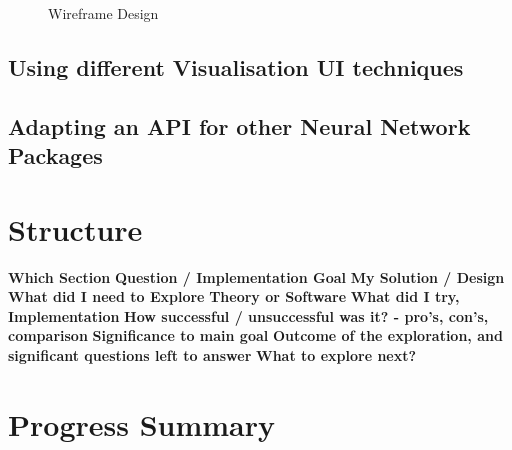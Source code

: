 \documentclass[a4paper,11pt,titlepage]{article}
\begin{document}
	\begin{figure}[H]
    			\caption{Wireframe Design}%
	\end{figure}	
	
	\subsection{Using different Visualisation UI techniques}	
	\subsection{Adapting an API for other Neural Network Packages}
	
\section{Structure}
	\textbf{Which Section}
	\textbf{Question / Implementation Goal}
	\textbf{My Solution / Design}
	\textbf{What did I need to Explore}
	\textbf{Theory or Software}
	\textbf{What did I try, Implementation}
	\textbf{How successful / unsuccessful was it? - pro's, con's, comparison}
	\textbf{Significance to main goal}
	\textbf{Outcome of the exploration, and significant questions left to answer}
	\textbf{What to explore next?}

































\section{Progress Summary}
\end{document}
